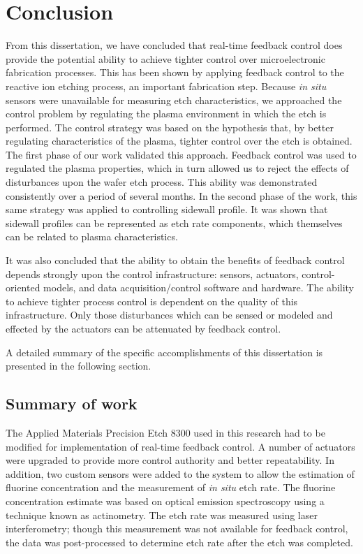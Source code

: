 \chapter{Conclusion}

\tab From this dissertation, we have concluded that real-time feedback control does provide
the potential ability to achieve tighter control over microelectronic fabrication processes.
This has been shown by applying feedback control to the reactive ion etching process, an
important fabrication step. Because \textit{in situ} sensors were unavailable for measuring etch characteristics, we approached the control problem by regulating the plasma environment
in which the etch is performed. The control strategy was based on the hypothesis that,
by better regulating characteristics of the plasma, tighter control over the etch is obtained.
The first phase of our work validated this approach. Feedback control was used to regulated
the plasma properties, which in turn allowed us to reject the effects of disturbances upon
the wafer etch process. This ability was demonstrated consistently over a period of several
months. In the second phase of the work, this same strategy was applied to controlling sidewall profile. It was shown that sidewall profiles can be represented as etch rate components, which themselves can be related to plasma characteristics.

It was also concluded that the ability to obtain the benefits of feedback control depends
strongly upon the control infrastructure: sensors, actuators, control-oriented models, and
data acquisition/control software and hardware. The ability to achieve tighter process
control is dependent on the quality of this infrastructure. Only those disturbances which
can be sensed or modeled and effected by the actuators can be attenuated by feedback
control.

A detailed summary of the specific accomplishments of this dissertation is presented in
the following section.

\section{Summary of work}

\tab The Applied Materials Precision Etch 8300 used in this research had to be modified
for implementation of real-time feedback control. A number of actuators were upgraded to
provide more control authority and better repeatability. In addition, two custom sensors
were added to the system to allow the estimation of fluorine concentration and the measurement of \textit{in situ} etch rate. The fluorine concentration estimate was based on optical emission spectroscopy using a technique known as actinometry. The etch rate was measured using laser interferometry; though this measurement was not available for feedback control, the data was post-processed to determine etch rate after the etch was completed.

